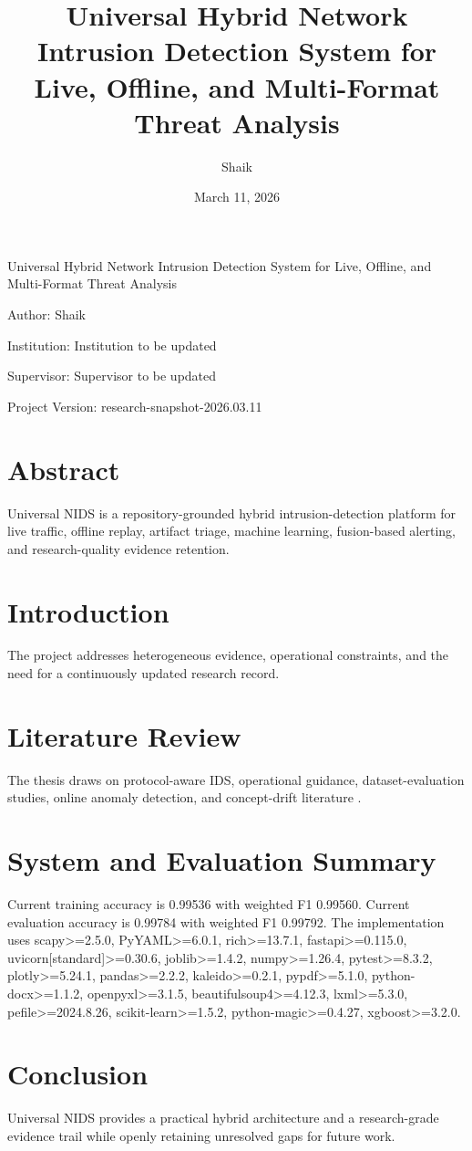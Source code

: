 \documentclass[12pt]{report}
\title{Universal Hybrid Network Intrusion Detection System for Live, Offline, and Multi-Format Threat Analysis}
\author{Shaik}
\date{March 11, 2026}
\begin{document}
\begin{titlepage}
\centering
{\LARGE Universal Hybrid Network Intrusion Detection System for Live, Offline, and Multi-Format Threat Analysis \par}
\vspace{1cm}
{\large Author: Shaik \par}
{\large Institution: Institution to be updated \par}
{\large Supervisor: Supervisor to be updated \par}
{\large Project Version: research-snapshot-2026.03.11 \par}
\end{titlepage}
\chapter*{Abstract}
Universal NIDS is a repository-grounded hybrid intrusion-detection platform for live traffic, offline replay, artifact triage, machine learning, fusion-based alerting, and research-quality evidence retention.
\chapter{Introduction}
The project addresses heterogeneous evidence, operational constraints, and the need for a continuously updated research record.
\chapter{Literature Review}
The thesis draws on protocol-aware IDS, operational guidance, dataset-evaluation studies, online anomaly detection, and concept-drift literature \cite{paxson1998bro,scarfone2007idps,dreger2006dynamic,tavallaee2009kdd,sharafaldin2018cicids,ring2019survey,mirsky2018kitsune,seth2024conceptdrift}.
\chapter{System and Evaluation Summary}
Current training accuracy is 0.99536 with weighted F1 0.99560. Current evaluation accuracy is 0.99784 with weighted F1 0.99792. The implementation uses scapy>=2.5.0, PyYAML>=6.0.1, rich>=13.7.1, fastapi>=0.115.0, uvicorn[standard]>=0.30.6, joblib>=1.4.2, numpy>=1.26.4, pytest>=8.3.2, plotly>=5.24.1, pandas>=2.2.2, kaleido>=0.2.1, pypdf>=5.1.0, python-docx>=1.1.2, openpyxl>=3.1.5, beautifulsoup4>=4.12.3, lxml>=5.3.0, pefile>=2024.8.26, scikit-learn>=1.5.2, python-magic>=0.4.27, xgboost>=3.2.0.
\chapter{Conclusion}
Universal NIDS provides a practical hybrid architecture and a research-grade evidence trail while openly retaining unresolved gaps for future work.


\end{document}
